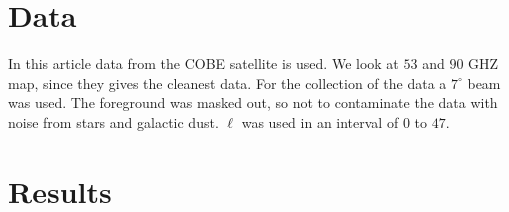 \documentclass{emulateapj}
\begin{document}
%
%

\section{Data}
\label{sec:data}

In this article data from the COBE satellite is used. We look at $53$ and $90$ GHZ map, since they gives the cleanest data. For the collection of the data a $7^{\circ}$ beam was used. The foreground was masked out, so not to contaminate the data with noise from stars and galactic dust. $\ell$ was used in an interval of $0$ to $47$. 


%

\section{Results}
\label{sec:results}
\end{document}
